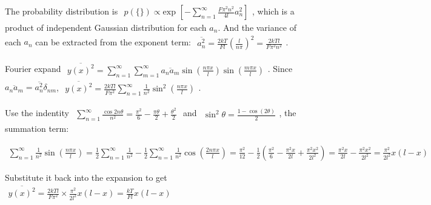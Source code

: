 \documentclass[../../main.tex]{subfiles}
\begin{document}
  The probability distribution is $\begin{aligned}
    p(\{\}) \propto \text{exp }\left[-\sum_{n=1}^{\infty}\frac{F\pi^{2}n^{2}}{4l}a_{n}^{2}\right]
  \end{aligned}$, which is a product of independent Gaussian distribution for each $a_{n}$. And the variance of each $a_{n}$ can be extracted from the exponent term: $\begin{aligned}
    \overline{a_{n}^{2}} = \frac{2kT}{Fl}\left(\frac{l}{n\pi}\right)^{2} = \frac{2kTl}{F\pi^{2}n^{2}}
  \end{aligned}$.

  Fourier expand $\begin{aligned}
    \overline{y(x)^{2}} = \sum_{n=1}^{\infty}\sum_{m=1}^{\infty}\overline{a_{n}a_{m}}\sin{\left(\frac{n\pi x}{l}\right)}\sin{\left(\frac{m\pi x}{l}\right)}
  \end{aligned}$. Since $\overline{a_{n}a_{m}} = \overline{a_{n}^{2}}\delta_{nm}$, $\begin{aligned}
    \overline{y(x)^{2}} = \frac{2kTl}{F\pi^{2}}\sum_{n=1}^{\infty}\frac{1}{n^{2}}\sin^{2}{\left(\frac{n\pi x}{l}\right)}
  \end{aligned}$. 

  Use the indentity $\begin{aligned}
    \sum_{n=1}^{\infty}\frac{\cos{2n\theta}}{n^{2}} = \frac{\pi^{2}}{6} - \frac{\pi\theta}{2} + \frac{\theta^{2}}{2}
  \end{aligned}$ and $\begin{aligned}
    \sin^{2}{\theta} = \frac{1-\cos{(2\theta)}}{2}
  \end{aligned}$, the summation term: 
  
  $\begin{aligned}
    \sum_{n=1}^{\infty}\frac{1}{n^{2}}\sin{\left(\frac{n\pi x}{l}\right)} = \frac{1}{2}\sum_{n=1}^{\infty}\frac{1}{n^{2}} - \frac{1}{2}\sum_{n=1}^{\infty}\frac{1}{n^{2}}\cos{\left(\frac{2n\pi x}{l}\right)} = \frac{\pi^{2}}{12} - \frac{1}{2}\left(
      \frac{\pi^{2}}{6} - \frac{\pi^{2}x}{2l} + \frac{\pi^{2}x^{2}}{2l^{2}}
    \right) = \frac{\pi^{2}x}{2l} - \frac{\pi^{2}x^{2}}{2l^{2}} = \frac{\pi^{2}}{2l^{2}}x(l-x)
  \end{aligned}$

  Substitute it back into the expansion to get $\begin{aligned}
    \overline{y(x)^{2}} = \frac{2kTl}{F\pi^{2}}\times \frac{\pi^{2}}{2l^{2}}x(l-x) = \boxed{\frac{kT}{Fl}x(l-x)}
  \end{aligned}$
\end{document}
